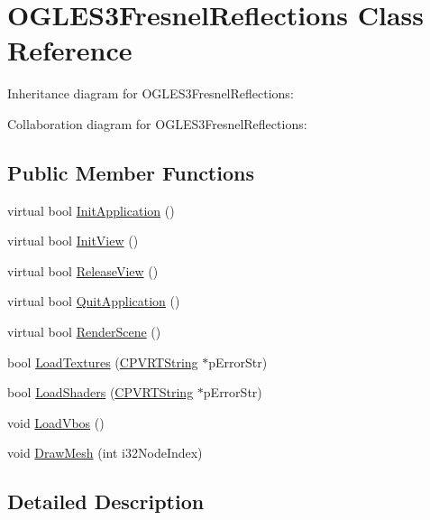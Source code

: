 \hypertarget{class_o_g_l_e_s3_fresnel_reflections}{\section{O\+G\+L\+E\+S3\+Fresnel\+Reflections Class Reference}
\label{class_o_g_l_e_s3_fresnel_reflections}
}


Inheritance diagram for O\+G\+L\+E\+S3\+Fresnel\+Reflections\+:


Collaboration diagram for O\+G\+L\+E\+S3\+Fresnel\+Reflections\+:
\subsection*{Public Member Functions}
\begin{DoxyCompactItemize}
\item 
virtual bool \hyperlink{class_o_g_l_e_s3_fresnel_reflections_ac99d46813ae3b31ea5669109c5a1a700}{Init\+Application} ()
\item 
virtual bool \hyperlink{class_o_g_l_e_s3_fresnel_reflections_af8516a2cc3d4d5d5dadc61493f26cb28}{Init\+View} ()
\item 
virtual bool \hyperlink{class_o_g_l_e_s3_fresnel_reflections_af5ae3171f47e1fcf15d3438c00d1f8ea}{Release\+View} ()
\item 
virtual bool \hyperlink{class_o_g_l_e_s3_fresnel_reflections_a10bc4d67810283a3af5d5db24ac2fba2}{Quit\+Application} ()
\item 
virtual bool \hyperlink{class_o_g_l_e_s3_fresnel_reflections_afa9408eb511bb825567e2711e37d0726}{Render\+Scene} ()
\item 
bool \hyperlink{class_o_g_l_e_s3_fresnel_reflections_a7e4af485d9110cd389961d0237444409}{Load\+Textures} (\hyperlink{class_c_p_v_r_t_string}{C\+P\+V\+R\+T\+String} $\ast$p\+Error\+Str)
\item 
bool \hyperlink{class_o_g_l_e_s3_fresnel_reflections_a79a2db0fd221976595bf0483ea18fc10}{Load\+Shaders} (\hyperlink{class_c_p_v_r_t_string}{C\+P\+V\+R\+T\+String} $\ast$p\+Error\+Str)
\item 
void \hyperlink{class_o_g_l_e_s3_fresnel_reflections_a8d97f0f794feb01d4eae5eed4f71b212}{Load\+Vbos} ()
\item 
void \hyperlink{class_o_g_l_e_s3_fresnel_reflections_a705af7d32a5ec0c2a23bb3f3de095878}{Draw\+Mesh} (int i32\+Node\+Index)
\end{DoxyCompactItemize}


\subsection{Detailed Description}


